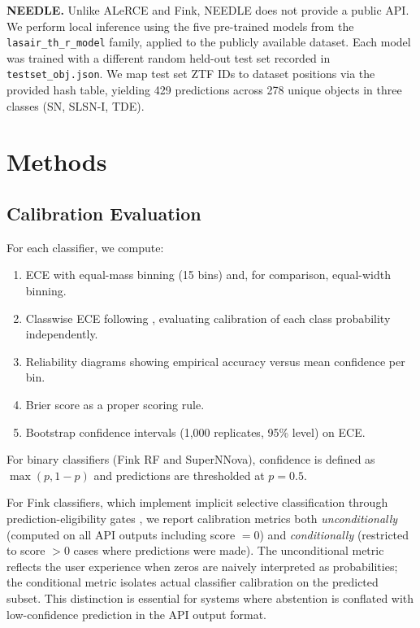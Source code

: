 \documentclass[twocolumn]{aastex631}
\begin{document}
\textbf{NEEDLE.} Unlike ALeRCE and Fink, NEEDLE \citep{sheng2024} does not provide a public API. We perform local inference using the five pre-trained models from the \texttt{lasair\_th\_r\_model} family, applied to the publicly available dataset. Each model was trained with a different random held-out test set recorded in \texttt{testset\_obj.json}. We map test set ZTF IDs to dataset positions via the provided hash table, yielding 429 predictions across 278 unique objects in three classes (SN, SLSN-I, TDE).


\section{Methods} \label{sec:methods}

\subsection{Calibration Evaluation}

For each classifier, we compute:
\begin{enumerate}
    \item ECE with equal-mass binning (15 bins) and, for comparison, equal-width binning.
    \item Classwise ECE following \citet{nixon2019}, evaluating calibration of each class probability independently.
    \item Reliability diagrams showing empirical accuracy versus mean confidence per bin.
    \item Brier score as a proper scoring rule.
    \item Bootstrap confidence intervals (1,000 replicates, 95\% level) on ECE.
\end{enumerate}

For binary classifiers (Fink RF and SuperNNova), confidence is defined as $\max(p, 1-p)$ and predictions are thresholded at $p = 0.5$.

For Fink classifiers, which implement implicit selective classification through prediction-eligibility gates \citep{geifman2017}, we report calibration metrics both \emph{unconditionally} (computed on all API outputs including score $= 0$) and \emph{conditionally} (restricted to score $> 0$ cases where predictions were made). The unconditional metric reflects the user experience when zeros are naively interpreted as probabilities; the conditional metric isolates actual classifier calibration on the predicted subset. This distinction is essential for systems where abstention is conflated with low-confidence prediction in the API output format.
\end{document}

